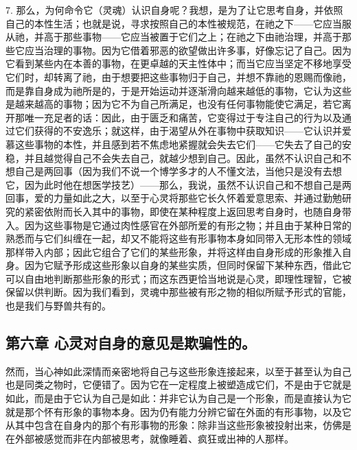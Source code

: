 7. 那么，为何命令它（灵魂）认识自身呢？我想，是为了让它思考自身，并依照自己的本性生活；也就是说，寻求按照自己的本性被规范，在祂之下——它应当服从祂，并高于那些事物——它应当被置于它们之上；在祂之下由祂治理，并高于那些它应当治理的事物。因为它借着邪恶的欲望做出许多事，好像忘记了自己。因为它看到某些内在本善的事物，在更卓越的天主性体中；而当它应当坚定不移地享受它们时，却转离了祂，由于想要把这些事物归于自己，并想不靠祂的恩赐而像祂，而是靠自身成为祂所是的，于是开始运动并逐渐滑向越来越低的事物，它认为这些是越来越高的事物；因为它不为自己所满足，也没有任何事物能使它满足，若它离开那唯一充足者的话：因此，由于匮乏和痛苦，它变得过于专注自己的行为以及通过它们获得的不安逸乐；就这样，由于渴望从外在事物中获取知识——它认识并爱慕这些事物的本性，并且感到若不焦虑地紧握就会失去它们——它失去了自己的安稳，并且越觉得自己不会失去自己，就越少想到自己。因此，虽然不认识自己和不想自己是两回事（因为我们不说一个博学多才的人不懂文法，当他只是没有去想它，因为此时他在想医学技艺）——那么，我说，虽然不认识自己和不想自己是两回事，爱的力量如此之大，以至于心灵将那些它长久怀着爱意思索、并通过勤勉研究的紧密依附而长入其中的事物，即使在某种程度上返回思考自身时，也随自身带入。因为这些事物是它通过肉性感官在外部所爱的有形之物；并且由于某种日常的熟悉而与它们纠缠在一起，却又不能将这些有形事物本身如同带入无形本性的领域那样带入内部；因此它组合了它们的某些形象，并将这样由自身形成的形象推入自身。因为它赋予形成这些形象以自身的某些实质，但同时保留下某种东西，借此它可以自由地判断那些形象的形式；而这东西更恰当地说是心灵，即理性理智，它被保留以供判断。因为我们看到，灵魂中那些被有形之物的相似所赋予形式的官能，也是我们与野兽共有的。\par


\subsection{第六章 心灵对自身的意见是欺骗性的。}

然而，当心神如此深情而亲密地将自己与这些形象连接起来，以至于甚至认为自己也是同类之物时，它便错了。因为它在一定程度上被塑造成它们，不是由于它就是如此，而是由于它认为自己是如此：并非它认为自己是一个形象，而是直接认为它就是那个怀有形象的事物本身。因为仍有能力分辨它留在外面的有形事物，以及它从其中包含在自身内的那个有形事物的形象：除非当这些形象被投射出来，仿佛是在外部被感觉而非在内部被思考，就像睡着、疯狂或出神的人那样。\par


